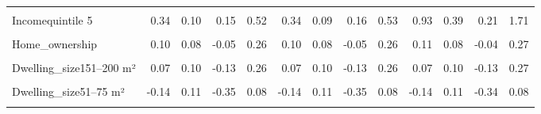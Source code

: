\begin{table}
\begin{tabular}[t]{lrrrrrrrrrrrr}
\cellcolor{gray!10}{Incomequintile 4} & \cellcolor{gray!10}{0.22} & \cellcolor{gray!10}{0.09} & \cellcolor{gray!10}{0.03} & \cellcolor{gray!10}{0.41} & \cellcolor{gray!10}{0.22} & \cellcolor{gray!10}{0.09} & \cellcolor{gray!10}{0.04} & \cellcolor{gray!10}{0.40} & \cellcolor{gray!10}{0.39} & \cellcolor{gray!10}{0.39} & \cellcolor{gray!10}{-0.37} & \cellcolor{gray!10}{1.12}\\
Incomequintile 5 & 0.34 & 0.10 & 0.15 & 0.52 & 0.34 & 0.09 & 0.16 & 0.53 & 0.93 & 0.39 & 0.21 & 1.71\\
\cellcolor{gray!10}{Higher\_edu} & \cellcolor{gray!10}{0.20} & \cellcolor{gray!10}{0.06} & \cellcolor{gray!10}{0.08} & \cellcolor{gray!10}{0.32} & \cellcolor{gray!10}{0.20} & \cellcolor{gray!10}{0.06} & \cellcolor{gray!10}{0.08} & \cellcolor{gray!10}{0.32} & \cellcolor{gray!10}{0.20} & \cellcolor{gray!10}{0.07} & \cellcolor{gray!10}{0.07} & \cellcolor{gray!10}{0.33}\\
Home\_ownership & 0.10 & 0.08 & -0.05 & 0.26 & 0.10 & 0.08 & -0.05 & 0.26 & 0.11 & 0.08 & -0.04 & 0.27\\
\cellcolor{gray!10}{Dwelling\_house} & \cellcolor{gray!10}{0.15} & \cellcolor{gray!10}{0.08} & \cellcolor{gray!10}{0.00} & \cellcolor{gray!10}{0.30} & \cellcolor{gray!10}{0.15} & \cellcolor{gray!10}{0.08} & \cellcolor{gray!10}{0.00} & \cellcolor{gray!10}{0.30} & \cellcolor{gray!10}{0.15} & \cellcolor{gray!10}{0.08} & \cellcolor{gray!10}{0.00} & \cellcolor{gray!10}{0.30}\\
Dwelling\_size151–200 m² & 0.07 & 0.10 & -0.13 & 0.26 & 0.07 & 0.10 & -0.13 & 0.26 & 0.07 & 0.10 & -0.13 & 0.27\\
\cellcolor{gray!10}{Dwelling\_size26–50 m²} & \cellcolor{gray!10}{0.00} & \cellcolor{gray!10}{0.14} & \cellcolor{gray!10}{-0.27} & \cellcolor{gray!10}{0.26} & \cellcolor{gray!10}{0.00} & \cellcolor{gray!10}{0.14} & \cellcolor{gray!10}{-0.27} & \cellcolor{gray!10}{0.27} & \cellcolor{gray!10}{-0.01} & \cellcolor{gray!10}{0.14} & \cellcolor{gray!10}{-0.29} & \cellcolor{gray!10}{0.26}\\
Dwelling\_size51–75 m² & -0.14 & 0.11 & -0.35 & 0.08 & -0.14 & 0.11 & -0.35 & 0.08 & -0.14 & 0.11 & -0.34 & 0.08\\
\cellcolor{gray!10}{Dwelling\_size76–100 m²} & \cellcolor{gray!10}{-0.12} & \cellcolor{gray!10}{0.09} & \cellcolor{gray!10}{-0.29} & \cellcolor{gray!10}{0.06} & \cellcolor{gray!10}{-0.12} & \cellcolor{gray!10}{0.09} & \cellcolor{gray!10}{-0.30} & \cellcolor{gray!10}{0.06} & \cellcolor{gray!10}{-0.12} & \cellcolor{gray!10}{0.09} & \cellcolor{gray!10}{-0.30} & \cellcolor{gray!10}{0.06}\\

\end{tabular}
\end{table}
